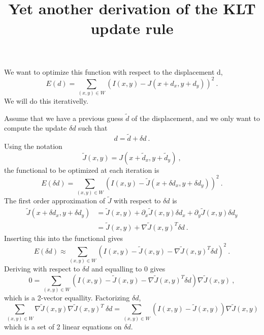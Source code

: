 \documentclass[a4paper,10pt]{article}
\title{Yet another derivation of the KLT update rule}
\author{}
\begin{document}
\maketitle

We want to optimize this function with respect to the displacement d,
\begin{equation}
 E(d) = \sum_{(x,y)\in W} (I(x,y) - J(x+d_x,y+d_y))^2 \ .
\end{equation}
We will do this iterativelly.

Assume that we have a previous guess $\tilde d$ of the displacement, and we only want to compute the update $\delta d$ such that
\begin{equation}
 d = \tilde d + \delta d \ .
\end{equation}
Using the notation
\begin{equation}
 \tilde J(x,y) = J(x + \tilde d_x, y + \tilde d_y) \ ,
\end{equation}
the functional to be optimized at each iteration is
\begin{equation}
 E(\delta d) = \sum_{(x,y)\in W} (I(x,y) - \tilde J(x + \delta d_x, y + \delta d_y))^2 \ .
\end{equation}
The first order approximation of $\tilde J$ with respect to  $\delta d$ is
\begin{equation}
\begin{split}
 \tilde J(x + \delta d_x, y + \delta d_y)
   & = \tilde J(x,y) + \partial_x \tilde J(x,y) \delta d_x + \partial_y \tilde J(x,y) \delta d_y
\\ & = \tilde J(x,y) + \nabla \tilde J(x,y)^T \delta d \ .
\end{split}
\end{equation}
Inserting this into the functional gives
\begin{equation}
 E(\delta d) \approx \sum_{(x,y)\in W} (I(x,y) - \tilde J(x,y) - \nabla \tilde J(x,y)^T \delta d)^2 \ .
\end{equation}
Deriving with respect to $\delta d$ and equalling to 0 gives
\begin{equation}
 0 =
 \sum_{(x,y)\in W} (I(x,y) - \tilde J(x,y)
          - \nabla \tilde J(x,y)^T \delta d)
        \nabla \tilde J(x,y) \ ,
\end{equation}
which is a 2-vector equallity.  Factorizing $\delta d$,
\begin{equation}
 \sum_{(x,y)\in W} \nabla \tilde J(x,y) \nabla \tilde J(x,y)^T \  \delta d
 = \sum_{(x,y)\in W} (I(x,y) - \tilde J(x,y)) \nabla \tilde J(x,y)
\end{equation}
which is a set of 2 linear equations on $\delta d$.
\end{document}
